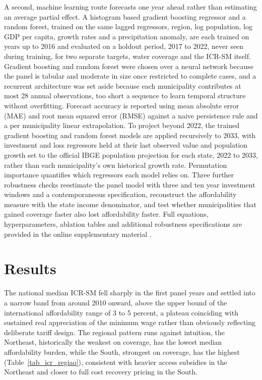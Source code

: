 \documentclass[preprint,12pt]{elsarticle}
\begin{document}
A second, machine learning route forecasts one year ahead rather than estimating an average partial effect. A histogram based gradient boosting regressor and a random forest, trained on the same lagged regressors, region, log population, log GDP per capita, growth rates and a precipitation anomaly, are each trained on years up to 2016 and evaluated on a holdout period, 2017 to 2022, never seen during training, for two separate targets, water coverage and the ICR-SM itself. Gradient boosting and random forest were chosen over a neural network because the panel is tabular and moderate in size once restricted to complete cases, and a recurrent architecture was set aside because each municipality contributes at most 28 annual observations, too short a sequence to learn temporal structure without overfitting. Forecast accuracy is reported using mean absolute error (MAE) and root mean squared error (RMSE) against a naive persistence rule and a per municipality linear extrapolation. To project beyond 2022, the trained gradient boosting and random forest models are applied recursively to 2033, with investment and loss regressors held at their last observed value and population growth set to the official IBGE population projection for each state, 2022 to 2033, rather than each municipality's own historical growth rate. Permutation importance quantifies which regressors each model relies on. Three further robustness checks reestimate the panel model with three and ten year investment windows and a contemporaneous specification, reconstruct the affordability measure with the state income denominator, and test whether municipalities that gained coverage faster also lost affordability faster. Full equations, hyperparameters, ablation tables and additional robustness specifications are provided in the online supplementary material \citep{Figueredo2026Repo}.

\section{Results}\label{sec2}

The national median ICR-SM fell sharply in the first panel years and settled into a narrow band from around 2010 onward, above the upper bound of the international affordability range of 3 to 5 percent, a plateau coinciding with sustained real appreciation of the minimum wage rather than obviously reflecting deliberate tariff design. The regional pattern runs against intuition, the Northeast, historically the weakest on coverage, has the lowest median affordability burden, while the South, strongest on coverage, has the highest (Table~\ref{tab_icr_regiao}), consistent with heavier access subsidies in the Northeast and closer to full cost recovery pricing in the South.
\end{document}
